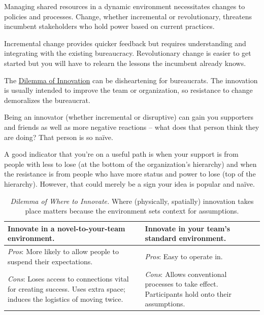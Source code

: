 Managing shared resources in a dynamic environment necessitates changes to policies and processes. Change, whether incremental or revolutionary, threatens incumbent stakeholders who hold power based on current practices. 

Incremental change provides quicker feedback but requires understanding and integrating with the existing bureaucracy. Revolutionary change is easier to get started but you will have to relearn the lessons the incumbent already knows.

The \hyperref[table:dilemma-personal-disruptive-or-iterative]{Dilemma of Innovation} can be disheartening for bureaucrats. The innovation is usually intended to improve the team or organization, so resistance to change demoralizes the bureaucrat. 

Being an innovator (whether incremental or disruptive) can gain you supporters and friends as well as more negative reactions -- what does that person think they are doing? That person is so na\"ive.

A good indicator that you're on a useful path is when your support is from people with less to lose (at the bottom of the organization's hierarchy) and when the resistance is from people who have more status and power to lose (top of the hierarchy). However, that could merely be a sign your idea is popular and na\"ive. 




\begin{center}
\begin{table}[H] %
\begin{tabular}{ | m{\dilemmatablewidth}| m{\dilemmatablewidth} | } 
  \hline
  \textbf{Innovate in a novel-to-your-team environment.} &
  \textbf{Innovate in your team's standard environment.} \\
  \hline
  \textit{Pros}: More likely to allow people to suspend their expectations.  & 
  \textit{Pros}: Easy to operate in. \\
  \hline
  \textit{Cons}: Loses access to connections vital for creating success. Uses extra space; induces the logistics of moving twice. & 
  \textit{Cons}: Allows conventional processes to take effect. Participants hold onto their assumptions. \\
  \hline
\end{tabular}
\caption{
\textit{Dilemma of Where to Innovate.}
Where (physically, spatially) innovation takes place matters because the environment sets context for assumptions.
}
\label{table:dilemma-personal-where-to-innovate}
\end{table}
\end{center}

